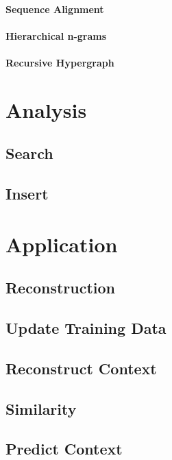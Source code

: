 \paragraph{Sequence Alignment}
\paragraph{Hierarchical n-grams}
\paragraph{Recursive Hypergraph}

\section{Analysis}
\subsection{Search}
\subsection{Insert}

\section{Application}
\subsection{Reconstruction}
\subsection{Update Training Data}
\subsection{Reconstruct Context}
\subsection{Similarity}
\subsection{Predict Context}


